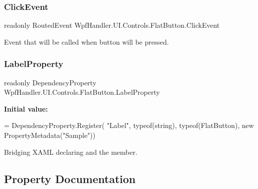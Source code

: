 \subsubsection{\texorpdfstring{Click\+Event}{ClickEvent}}
{\footnotesize\ttfamily readonly Routed\+Event Wpf\+Handler.\+U\+I.\+Controls.\+Flat\+Button.\+Click\+Event\hspace{0.3cm}{\ttfamily [static]}}



Event that will be called when button will be pressed. 

\mbox{\label{class_wpf_handler_1_1_u_i_1_1_controls_1_1_flat_button_acad3d234805ceee99eeced499fe8cd80}} 
\subsubsection{\texorpdfstring{Label\+Property}{LabelProperty}}
{\footnotesize\ttfamily readonly Dependency\+Property Wpf\+Handler.\+U\+I.\+Controls.\+Flat\+Button.\+Label\+Property\hspace{0.3cm}{\ttfamily [static]}}

{\bfseries Initial value\+:}
\begin{DoxyCode}
= DependencyProperty.Register(
          \textcolor{stringliteral}{"Label"}, typeof(\textcolor{keywordtype}{string}), typeof(FlatButton), \textcolor{keyword}{new} PropertyMetadata(\textcolor{stringliteral}{"Sample"}))
\end{DoxyCode}


Bridging X\+A\+ML declaring and the member. 



\subsection{Property Documentation}
\mbox{\label{class_wpf_handler_1_1_u_i_1_1_controls_1_1_flat_button_ad9184f68d9f9ae9db49fa4a82a97ae15}} 
